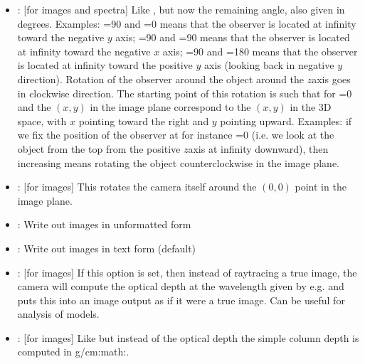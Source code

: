 \documentclass[letterpaper,10pt,english]{sphinxmanual}
\begin{document}
\begin{itemize}
\item {} 
: {[}for images and spectra{]} Like , but now the remaining
angle, also given in degrees. Examples: =90 and =0 means
that the observer is located at infinity toward the negative \(y\) axis;
=90 and =90 means that the observer is located at infinity
toward the negative \(x\) axis; =90 and =180 means that
the observer is located at infinity toward the positive \(y\) axis
(looking back in negative \(y\) direction). Rotation of the observer
around the object around the \(z\)\sphinxhyphen{}axis goes in clockwise direction. The
starting point of this rotation is such that for =0 and 
the \((x,y)\) in the image plane correspond to the \((x,y)\) in the
3\sphinxhyphen{}D space, with \(x\) pointing toward the right and \(y\) pointing
upward. Examples: if we fix the position of the observer at for instance
=0 (i.e. we look at the object from the top from the positive
\(z\)\sphinxhyphen{}axis at infinity downward), then increasing  means rotating
the object counter\sphinxhyphen{}clockwise in the image plane.

\item {} 
: {[}for images{]} This rotates the camera itself around
the \((0,0)\) point in the image plane.

\item {} 
: Write out images in unformatted form

\item {} 
: Write out images in text form (default)

\item {} 
: {[}for images{]} If this option is set, then instead
of ray\sphinxhyphen{}tracing a true image, the camera will compute the optical depth
at the wavelength given by e.g.  and puts this into an image
output as if it were a true image. Can be useful for analysis of models.

\item {} 
: {[}for images{]} Like  but instead of the optical
depth the simple column depth is computed in g/cm:math:. 


\end{itemize}
\end{document}

